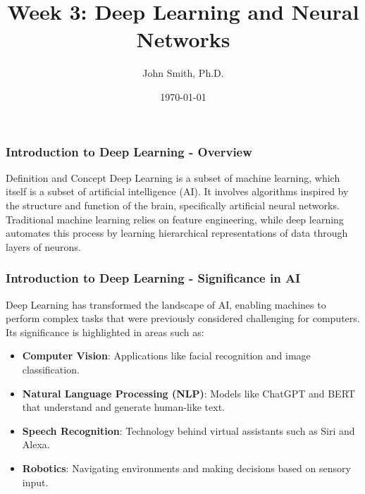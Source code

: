 \documentclass[aspectratio=169]{beamer}
\title[Week 3: Deep Learning and Neural Networks]{Week 3: Deep Learning and Neural Networks}
\author[J. Smith]{John Smith, Ph.D.}
\institute[University Name]{
  Department of Computer Science\\
  University Name\\
  \vspace{0.3cm}
  Email: email@university.edu\\
  Website: www.university.edu
}
\date{\today}
\begin{document}
\frame{\titlepage}

\begin{frame}[fragile]
    \frametitle{Introduction to Deep Learning - Overview}
    \begin{block}{Definition and Concept}
        Deep Learning is a subset of machine learning, which itself is a subset of artificial intelligence (AI). 
        It involves algorithms inspired by the structure and function of the brain, specifically artificial neural networks. 
        Traditional machine learning relies on feature engineering, while deep learning automates this process by learning 
        hierarchical representations of data through layers of neurons.
    \end{block}
\end{frame}

\begin{frame}[fragile]
    \frametitle{Introduction to Deep Learning - Significance in AI}
    Deep Learning has transformed the landscape of AI, enabling machines to perform complex tasks that were previously 
    considered challenging for computers. Its significance is highlighted in areas such as:
    
    \begin{itemize}
        \item \textbf{Computer Vision}: Applications like facial recognition and image classification.
        \item \textbf{Natural Language Processing (NLP)}: Models like ChatGPT and BERT that understand and generate human-like text.
        \item \textbf{Speech Recognition}: Technology behind virtual assistants such as Siri and Alexa.
        \item \textbf{Robotics}: Navigating environments and making decisions based on sensory input.
    \end{itemize}
\end{frame}
\end{document}
